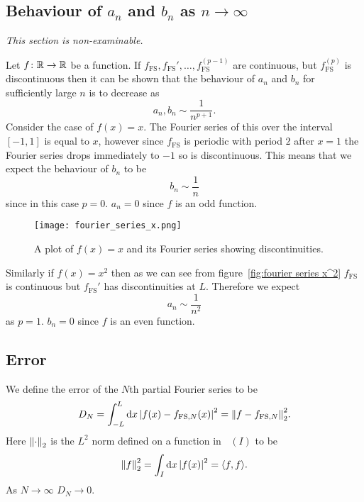 \documentclass[a4paper]{article}
\renewcommand{\innerproduct}[2]{\langle {#1} , {#2} \rangle}
\newcommand{\FS}{{\mathrm{FS}}}
\newcommand{\lnorm}[2][]{\norm{#2}_{#1}}
\DeclareMathOperator{\squareIntegrable}{L^2}
\begin{document}
    \subsection{Behaviour of \texorpdfstring{\(a_n\)}{an} and \texorpdfstring{\(b_n\)}{bn} as \texorpdfstring{\(n\to\infty\)}{n->infinity}}
    \textit{This section is non-examinable.}
    
    Let \(f\colon\mathbb{R}\to\mathbb{R}\) be a function.
    If \(f_\FS, f_\FS', \dotsc, f_\FS^{(p-1)}\) are continuous, but \(f_\FS^{(p)}\) is discontinuous then it can be shown that the behaviour of \(a_n\) and \(b_n\) for sufficiently large \(n\) is to decrease as
    \[a_n, b_n \sim \frac{1}{n^{p+1}}.\]
    Consider the case of \(f(x) = x\).
    The Fourier series of this over the interval \([-1, 1]\) is equal to \(x\), however since \(f_\FS\) is periodic with period \(2\) after \(x = 1\) the Fourier series drops immediately to \(-1\) so is discontinuous.
    This means that we expect the behaviour of \(b_n\) to be
    \[b_n \sim \frac{1}{n}\]
    since in this case \(p = 0\).
    \(a_n = 0\) since \(f\) is an odd function.
    
    \begin{figure}[ht]
        \centering
        \texttt{[image: fourier\_series\_x.png]}
        \caption{A plot of \(f(x) = x\) and its Fourier series showing discontinuities.}
    \end{figure}
    
    Similarly if \(f(x) = x^2\) then as we can see from figure~\ref{fig:fourier series x^2} \(f_\FS\) is continuous but \(f_\FS'\) has discontinuities at \(L\).
    Therefore we expect
    \[a_n \sim \frac{1}{n^2}\]
    as \(p = 1\).
    \(b_n = 0\) since \(f\) is an even function.
    
    \subsection{Error}
    We define the error of the \(N\)th partial Fourier series to be
    \[D_N = \int_{-L}^{L} \dd{x}\abs{f(x) - f_{\FS, N}(x)}^2 = \lnorm[2]{f - f_{\FS,N}}^2.\]
    Here \(\lnorm[2]{\cdot}\) is the \(L^2\) norm defined on a function in \(\squareIntegrable(I)\) to be
    \[\lnorm[2]{f}^2 = \int_I \dd{x} \abs{f(x)}^2 = \innerproduct{f}{f}.\]
    As \(N\to\infty\) \(D_N\to 0\).
    
\end{document}
